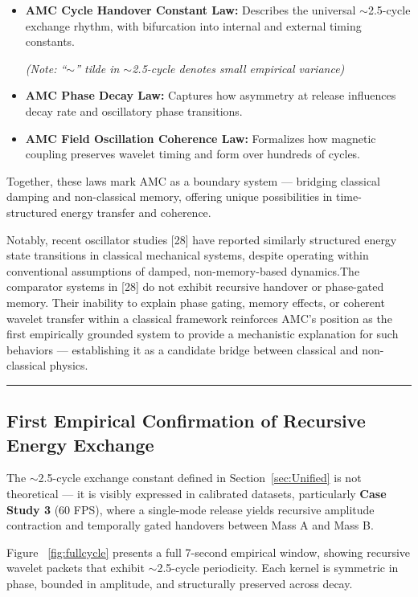 \documentclass[10pt,aps,pre,onecolumn,superscriptaddress,notitlepage]{revtex4-2}
\begin{document}
\begin{itemize}
    \item \textbf{AMC Cycle Handover Constant Law:} Describes the universal $\sim$2.5-cycle exchange rhythm, with bifurcation into internal and external timing constants.
    
\textit{(Note: “$\sim$” tilde in $\sim$2.5-cycle denotes small empirical variance)}

    \item \textbf{AMC Phase Decay Law:} Captures how asymmetry at release influences decay rate and oscillatory phase transitions.
    \item \textbf{AMC Field Oscillation Coherence Law:} Formalizes how magnetic coupling preserves wavelet timing and form over hundreds of cycles.
\end{itemize}

Together, these laws mark AMC as a boundary system — bridging classical damping and non-classical memory, offering unique possibilities in time-structured energy transfer and coherence.

Notably, recent oscillator studies [28] have reported similarly structured energy state transitions in classical mechanical systems, despite operating within conventional assumptions of damped, non-memory-based dynamics.The comparator systems in [28] do not exhibit recursive handover or phase-gated memory. Their inability to explain phase gating, memory effects, or coherent wavelet transfer within a classical framework reinforces AMC’s position as the first empirically grounded system to provide a mechanistic explanation for such behaviors — establishing it as a candidate bridge between classical and non-classical physics. 

\vspace{1em}
\hrule
\vspace{1em}
\clearpage
\subsection{First Empirical Confirmation of Recursive Energy Exchange}
\label{sec:FirstEmpiricalConfirmation}
The $\sim$2.5-cycle exchange constant defined in Section~\ref{sec:Unified} is not theoretical — it is visibly expressed in calibrated datasets, particularly \textbf{Case Study 3} (60 FPS), where a single-mode release yields recursive amplitude contraction and temporally gated handovers between Mass A and Mass B.

Figure ~\ref{fig:fullcycle} presents a full 7-second empirical window, showing recursive wavelet packets that exhibit $\sim$2.5-cycle periodicity. Each kernel is symmetric in phase, bounded in amplitude, and structurally preserved across decay.
\end{document}
